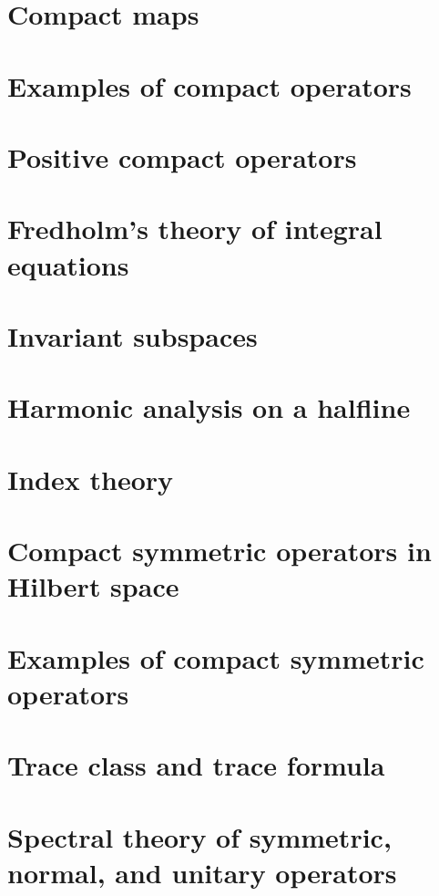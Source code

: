 \documentclass[11pt]{elegantbook}
\begin{document}
\chapter{Compact maps}

\chapter{Examples of compact operators}

\chapter{Positive compact operators}

\chapter{Fredholm's theory of integral equations}

\chapter{Invariant subspaces}

\chapter{Harmonic analysis on a halfline}

\chapter{Index theory}

\chapter{Compact symmetric operators in Hilbert space}

\chapter{Examples of compact symmetric operators}

\chapter{Trace class and trace formula}

\chapter{Spectral theory of symmetric, normal, and unitary operators}
\end{document}

